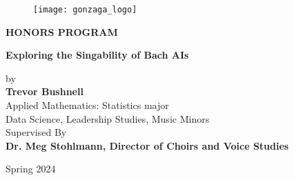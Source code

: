 \thispagestyle{empty} %

\begin{center}
\begin{figure}
  \begin{center}
    \texttt{[image: gonzaga\_logo]}
  \end{center}
\end{figure}
\small
\textbf{HONORS PROGRAM}



\vfill
\Large
\textbf{Exploring the Singability of Bach AIs} \\ 

\vfill
\small


\vfill
\small
by\\
\large
\textbf{Trevor Bushnell}\\
\small
Applied Mathematics: Statistics major  \\
Data Science, Leadership Studies, Music Minors\\


\vfill
\small
Supervised By\\
\normalsize
\textbf{
	  Dr. Meg Stohlmann, Director of Choirs and Voice Studies}

\vfill
\small
Spring 2024\\

\end{center}
